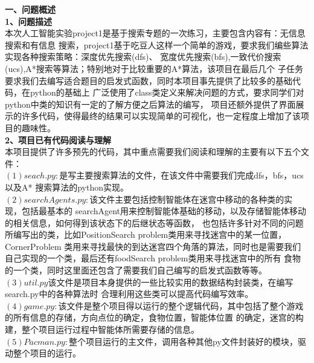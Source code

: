 \documentclass[a4paper,12pt,UTF8]{article}
\begin{document}
\begin{flushleft}
{
       \Large{
        \textbf{一、问题概述\\}
       }
       \large{
        \hspace{1cm}\textbf{1、问题描述\\}
       }
       \hspace{1cm}\normalsize{
            本次人工智能实验project1是基于搜索专题的一次练习，主要包含内容有：无信息搜索和有信息
            搜索，project1基于吃豆人这样一个简单的游戏，要求我们编些算法实现各种搜索策略：深度优先搜索(dfs)、
            宽度优先搜索(bfs),一致代价搜索(ucs),A*搜索等算法；特别地对于比较重要的A*算法，该项目在最后几个
            子任务要求我们去编写适合题目的启发式函数，同时本项目事先提供了比较多的基础代码，在python的基础上
            广泛使用了class类定义来解决问题的方式，要求同学们对python中类的知识有一定的了解方便之后算法的编写，
            项目还额外提供了界面展示的许多代码，使得最终的结果可以实现简单的可视化，也一定程度上增加了该项目的趣味性。\\

    }
    \large{
        \hspace{1cm}\textbf{2、项目已有代码阅读与理解\\}
    }
    \hspace{1cm}\normalsize{
        本项目提供了许多预先的代码，其中重点需要我们阅读和理解的主要有以下五个文件：\\
        \hspace{1cm}$(1)seach.py:$是写主要搜索算法的文件，在该文件中需要我们完成dfs，bfs，ucs以及A*
        搜索算法的python实现。\\
        \hspace{1cm}$(2)searchAgents.py:$该文件主要包括控制智能体在迷宫中移动的各种类的实现，包括最基本的
        searchAgent用来控制智能体基础的移动，以及存储智能体移动的相关信息，如何得到该状态下的后继状态等函数，
        也包括许多针对不同的问题所编写出的类，比如PositionSearch problem类用来寻找迷宫中的某一位置，CornerProblem
        类用来寻找最快的到达迷宫四个角落的算法，同时也是需要我们自己实现的一个类，最后还有foodSearch problem类用来寻找迷宫中的所有
        食物的一个类，同时这里面还包含了需要我们自己编写的启发式函数等等。\\
        \hspace{1cm}$(3)util.py$该文件是项目本身提供的一些比较实用的数据结构封装类，在编写search.py中的各种算法时
        合理利用这些类可以提高代码编写效率。\\
        \hspace{1cm}$(4)game.py:$该文件是整个项目得以运行的整个逻辑代码，其中包括了整个游戏的所有信息的存储，方向点位的确定，食物位置，智能体位置
        的确定，迷宫的构建，整个项目运行过程中智能体所需要存储的信息。\\
        \hspace{1cm}$(5)Pacman.py:$整个项目运行的主文件，调用各种其他py文件封装好的模块，驱动整个项目的运行。\\

}}
\end{flushleft}
\end{document}
